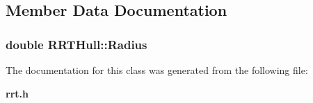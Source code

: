 \subsection{Member Data Documentation}
\subsubsection{\setlength{\rightskip}{0pt plus 5cm}double RRTHull::Radius}\label{class_RRTHull_m0}




The documentation for this class was generated from the following file:\begin{CompactItemize}
\item 
{\bf rrt.h}\end{CompactItemize}

